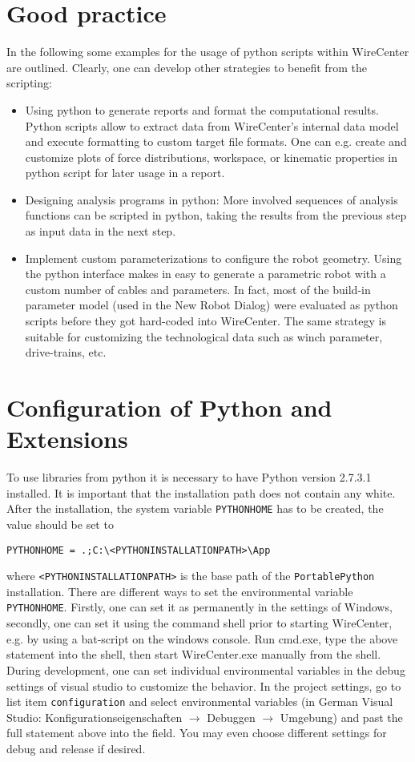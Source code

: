 \documentclass[11pt,a4paper,onepage,openany]{book}
\def\<#1>{\texttt{<#1>}}
\begin{document}
\section{Good practice}
In the following some examples for the usage of python scripts within WireCenter are outlined. Clearly, one can develop other strategies to benefit from the scripting:
\begin{itemize}
\item Using python to generate reports and format the computational results. Python scripts allow to extract data from WireCenter's internal data model and execute formatting to custom target file formats. One can e.g. create and customize plots of force distributions, workspace, or kinematic properties in python script for later usage in a report.

\item Designing analysis programs in python: More involved sequences of analysis functions can be scripted in python, taking the results from the previous step as input data in the next step.

\item Implement custom parameterizations to configure the robot geometry. Using the python interface makes in easy to generate a parametric robot with a custom number of cables and parameters. In fact, most of the build-in parameter model (used in the New Robot Dialog) were evaluated as python scripts before they got hard-coded into WireCenter. The same strategy is suitable for customizing the technological data such as winch parameter, drive-trains, etc.
\end{itemize}

\section{Configuration of Python and Extensions}
To use libraries from python it is necessary to have Python version 2.7.3.1
installed. It is important that the installation path does not contain any white.
After the installation, the system variable \texttt{PYTHONHOME} has to be created,
the value should be set to
\begin{verbatim}
PYTHONHOME = .;C:\<PYTHONINSTALLATIONPATH>\App
\end{verbatim}
where \texttt{<PYTHONINSTALLATIONPATH>} is the base path of the
\texttt{PortablePython} installation. There are different ways to set the
environmental variable \texttt{PYTHONHOME}. Firstly, one can set it as
permanently in the settings of Windows, secondly, one can set it using the
command shell prior to starting WireCenter, e.g. by using a bat-script on the
windows console. Run cmd.exe, type the above statement into the shell, then
start WireCenter.exe manually from the shell. During development, one can set
individual environmental variables in the debug settings of visual studio to
customize the behavior. In the project settings, go to list item
\texttt{configuration} and select environmental variables (in German Visual
Studio: Konfigurationseigenschaften $\rightarrow$ Debuggen $\rightarrow$
Umgebung) and past the full statement above into the field. You may even choose
different settings for debug and release if desired.
\end{document}
